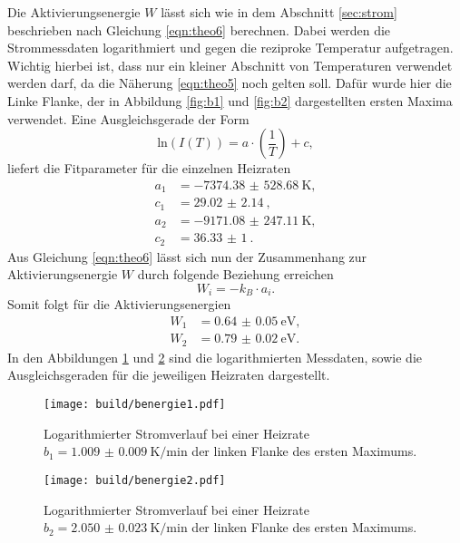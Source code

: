 Die Aktivierungsenergie $W$ lässt sich wie in dem Abschnitt \ref{sec:strom} beschrieben nach Gleichung \eqref{eqn:theo6} berechnen. Dabei werden die Strommessdaten logarithmiert und gegen 
die reziproke Temperatur aufgetragen. Wichtig hierbei ist, dass nur ein kleiner Abschnitt von Temperaturen verwendet werden darf, da
die Näherung \eqref{eqn:theo5} noch gelten soll. Dafür wurde hier die Linke Flanke, der in Abbildung \ref{fig:b1} und \ref{fig:b2} dargestellten ersten Maxima verwendet. Eine Ausgleichsgerade der Form
\begin{equation}
\text{ln}(I(T)) = a \cdot \left( \frac{1}{T}\right) + c,
\end{equation}
liefert die Fitparameter für die einzelnen Heizraten
\begin{align*}
a_1 &= \SI{-7374.38(52868)}{\kelvin},\\
c_1&= \SI{29.02(214)}{},\\
a_2 &= \SI{-9171.08(24711)}{\kelvin},\\
c_2&= \SI{36.33(100)}{}.
\end{align*}
Aus Gleichung \eqref{eqn:theo6} lässt sich nun der Zusammenhang zur Aktivierungsenergie $W$ durch folgende Beziehung erreichen
\begin{equation}
W_i = - k_B \cdot a_i.
\end{equation}
Somit folgt für die Aktivierungsenergien 
\begin{align}
W_1 &= \SI{0.64(5)}{\electronvolt},\\
W_2 &= \SI{0.79(2)}{\electronvolt}.
\end{align}
In den Abbildungen \ref{fig:a4} und \ref{fig:a5} sind die logarithmierten Messdaten, sowie die Ausgleichsgeraden für die jeweiligen Heizraten dargestellt.
\begin{figure}
    \centering
    \texttt{[image: build/benergie1.pdf]}
    \caption{Logarithmierter Stromverlauf bei einer Heizrate \newline $b_1 = \SI{1.009(9)}{\kelvin\per\minute}$ der linken Flanke des ersten Maximums.
            }
    \label{fig:a4}
\end{figure}
\begin{figure}
    \centering
    \texttt{[image: build/benergie2.pdf]}
    \caption{Logarithmierter Stromverlauf bei einer Heizrate \newline $b_2 = \SI{2.050(23)}{\kelvin\per\minute}$ der linken Flanke des ersten Maximums.
            }
    \label{fig:a5}
\end{figure}

